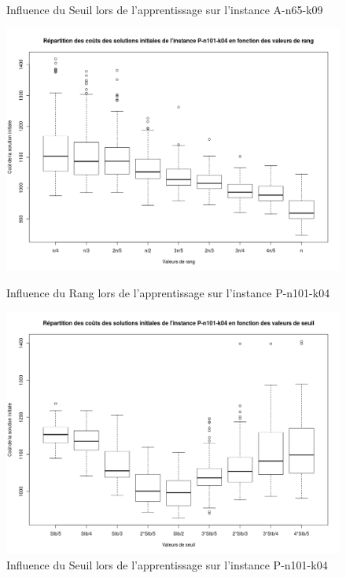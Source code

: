 \documentclass[a4paper,11pt]{article}%
\begin{document}
\begin{figure}
\begin{minipage}[c]{.46\linewidth}
        \caption{Influence du Seuil lors de l'apprentissage sur l'instance A-n65-k09}
        \label{InfSA6509}
    \end{minipage}    
    
        \begin{minipage}[c]{.46\linewidth}
        \centering
        \includegraphics[scale=0.25]{InfluenceRangP10104}
        
        \caption{Influence du Rang lors de l'apprentissage sur l'instance P-n101-k04}
        \label{InfRP10104}
    \end{minipage}
    \hfill%
    \begin{minipage}[c]{.46\linewidth}
        \centering
        \includegraphics[scale=0.25]{InfluenceSeuilP10104}
        
        \caption{Influence du Seuil lors de l'apprentissage sur l'instance P-n101-k04}
        \label{InfSP10104}
    \end{minipage}
\end{figure}
\end{document}
